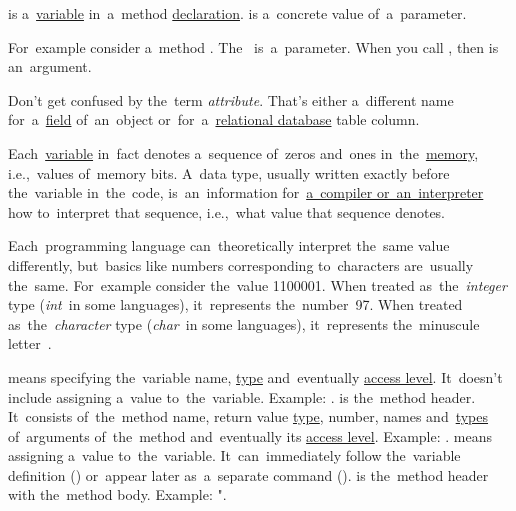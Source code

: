 \label{parameterargument}
\begin{itemize}
     is a~\hyperref[variablefieldproperty]{variable} in~a~method \hyperref[declarationdefinition]{declaration}.
     is a~concrete value of~a~parameter.
\end{itemize}
For~example consider a~method .
The~ is~a~parameter.
When you call , then  is an~argument.

\warning Don't get confused by the~term \textit{attribute}.
That's either a~different name for~a~\hyperref[variablefieldproperty]{field} of~an~object or~for~a~\hyperref[relationaldatabase]{relational database} table column.

\label{datatypes}
Each~\hyperref[variablefieldproperty]{variable} in~fact denotes a~sequence of~zeros and~ones in~the~\hyperref[systemmemory]{memory}, i.e.,~values of~memory bits.
A~data type, usually written exactly before the~variable in~the~code, is~an~information for~\hyperref[compiledinterpretedlanguages]{a~compiler or~an~interpreter} how to~interpret that sequence, i.e.,~what value that sequence denotes.

Each~programming language can~theoretically interpret the~same value differently, but~basics like numbers corresponding to~characters are~usually the~same.
For~example consider the~value 1100001.
When treated as~the~\textit{integer} type (\textit{int}~in some languages), it~represents the~number~97.
When treated as~the~\textit{character} type (\textit{char}~in some languages), it~represents the~minuscule letter~.

\label{declarationdefinition}
\begin{itemize}
     means specifying the~variable name, \hyperref[datatypes]{type} and~eventually \hyperref[javaaccessmodifiers]{access level}.
            It~doesn't include assigning a~value to~the~variable.
            Example: .
     is the~method header.
            It~consists of~the~method name, return value \hyperref[datatypes]{type}, number, names and~\hyperref[datatypes]{types} of~arguments of~the~method and~eventually its \hyperref[javaaccessmodifiers]{access level}.
            Example: .
     means assigning a~value to~the~variable.
            It~can~immediately follow the~variable definition () or~appear later as~a~separate command ().
     is the~method header with the~method body.
            Example: ".
\end{itemize}

